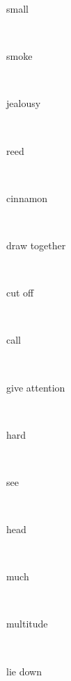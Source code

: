 \documentclass[a4paper]{article}
\begin{document}
\begin{multicols}{4}
\begin{multicols}{4}
\begin{multicols}{5}
{\hebrewfont{}} \begin{english}small\end{english}\\
{\hebrewfont{}} \begin{english}smoke\end{english}\\
{\hebrewfont{}} \begin{english}jealousy\end{english}\\
{\hebrewfont{}} \begin{english}reed\end{english}\\
{\hebrewfont{}} \begin{english}cinnamon\end{english}\\
{\hebrewfont{}} \begin{english}draw together\end{english}\\
{\hebrewfont{}} \begin{english}cut off\end{english}\\
{\hebrewfont{}} \begin{english}call\end{english}\\
{\hebrewfont{}} \begin{english}give attention\end{english}\\
{\hebrewfont{}} \begin{english}hard\end{english}\\
{\hebrewfont{}} \begin{english}see\end{english}\\
{\hebrewfont{}} \begin{english}head\end{english}\\
{\hebrewfont{}} \begin{english}much\end{english}\\
{\hebrewfont{}} \begin{english}multitude\end{english}\\
{\hebrewfont{}} \begin{english}lie down\end{english}\\

\end{multicols}
\end{multicols}
\end{multicols}
\end{document}
